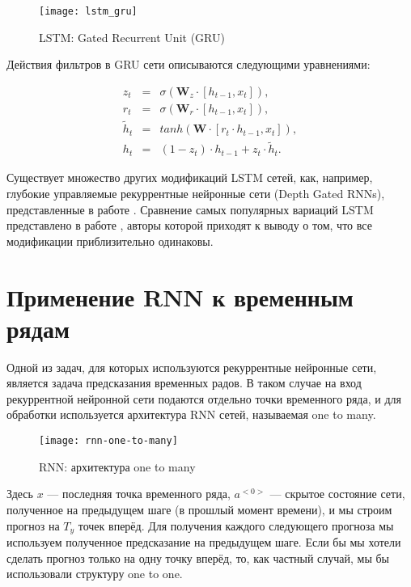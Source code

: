 \documentclass[specialist,
               substylefile = spbu.rtx,
               subf, 
               colorlinks=true, 12pt]{disser}
\begin{document}
\begin{figure}[!h]
\begin{center}
\texttt{[image: lstm\_gru]}
\end{center}
\caption{LSTM: Gated Recurrent Unit (GRU)}
\end{figure}


Действия фильтров в GRU сети описываются следующими уравнениями:

\begin{eqnarray*}
z_t &=& \sigma(\mathbf{W}_z \cdot [h_{t-1},x_t]), \\
r_t &=& \sigma(\mathbf{W}_r \cdot [h_{t-1},x_t]), \\
\widetilde{h}_t &=& tanh(\mathbf{W} \cdot[r_t \cdot h_{t-1},x_t]), \\
h_t &=& (1 - z_t) \cdot h_{t-1} + z_t \cdot \widetilde{h}_t. 
\end{eqnarray*}
 

Существует множество других модификаций LSTM сетей, как, например, глубокие управляемые рекуррентные нейронные сети (Depth Gated RNNs), представленные в работе \cite{yao}. Сравнение самых популярных вариаций LSTM представлено в работе \cite{Jozefowicz}, авторы которой приходят к выводу о том, что все модификации приблизительно одинаковы.

\section{Применение RNN к временным рядам}

Одной из задач, для которых используются рекуррентные нейронные сети, является задача предсказания временных радов. В таком случае на вход рекуррентной нейронной сети подаются отдельно точки временного ряда, и для обработки используется архитектура RNN сетей, называемая one to many.

\begin{figure}[!h]
\begin{center}
\texttt{[image: rnn-one-to-many]}
\end{center}
\caption{RNN: архитектура one to many}
\end{figure}

Здесь $x$ --- последняя точка временного ряда, $a^{<0>}$ --- скрытое состояние сети, полученное на предыдущем шаге (в прошлый момент времени), и мы строим прогноз на $T_y$ точек вперёд. Для получения каждого следующего прогноза мы используем полученное предсказание на предыдущем шаге. Если бы мы хотели сделать прогноз только на одну точку вперёд, то, как частный случай, мы бы использовали структуру one to one.



\end{document}

